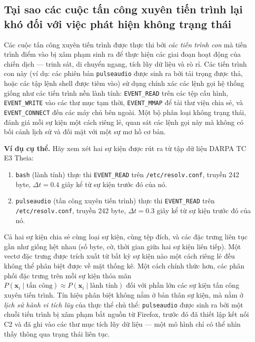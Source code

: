 \documentclass[letterpaper,twocolumn,10pt]{article}
\begin{document}
\subsection{Tại sao các cuộc tấn công xuyên tiến trình lại khó đối với việc phát hiện không trạng thái}
\label{sec:crossprocess_hard}

Các cuộc tấn công xuyên tiến trình được thực thi bởi \emph{các tiến trình con} mà tiến trình điểm vào bị xâm phạm sinh ra để thực hiện các giai đoạn hoạt động của chiến dịch --- trinh sát, di chuyển ngang, tích lũy dữ liệu và rò rỉ. Các tiến trình con này (ví dụ: các phiên bản \texttt{pulseaudio} được sinh ra bởi tải trọng được thả, hoặc các tập lệnh shell được tiêm vào) sử dụng chính xác các lệnh gọi hệ thống giống như các tiến trình nền lành tính: \texttt{EVENT\_READ} trên các tệp cấu hình, \texttt{EVENT\_WRITE} vào các thư mục tạm thời, \texttt{EVENT\_MMAP} để tải thư viện chia sẻ, và \texttt{EVENT\_CONNECT} đến các máy chủ bên ngoài. Một bộ phân loại không trạng thái, đánh giá mỗi sự kiện một cách riêng lẻ, quan sát các lệnh gọi này mà không có bối cảnh lịch sử và đối mặt với một sự mơ hồ cơ bản.

\textbf{Ví dụ cụ thể.} Hãy xem xét hai sự kiện được rút ra từ tập dữ liệu DARPA TC E3 Theia:
\begin{enumerate}
    \item \texttt{bash} (lành tính) thực thi \texttt{EVENT\_READ} trên \texttt{/etc/resolv.conf}, truyền 242 byte, $\Delta t = 0.4$ giây kể từ sự kiện trước đó của nó.
    \item \texttt{pulseaudio} (tấn công xuyên tiến trình) thực thi \texttt{EVENT\_READ} trên \texttt{/etc/resolv.conf}, truyền 242 byte, $\Delta t = 0.3$ giây kể từ sự kiện trước đó của nó.
\end{enumerate}
Cả hai sự kiện chia sẻ cùng loại sự kiện, cùng tệp đích, và các đặc trưng liên tục gần như giống hệt nhau (số byte, cờ, thời gian giữa hai sự kiện liên tiếp). Một vectơ đặc trưng được trích xuất từ bất kỳ sự kiện nào một cách riêng lẻ đều không thể phân biệt được về mặt thống kê. Một cách chính thức hơn, các phân phối đặc trưng trên mỗi sự kiện thỏa mãn $P(\mathbf{x}_i \mid \text{tấn công}) \approx P(\mathbf{x}_i \mid \text{lành tính})$ đối với phần lớn các sự kiện tấn công xuyên tiến trình. Tín hiệu phân biệt không nằm ở bản thân sự kiện, mà nằm ở \emph{lịch sử hành vi tích lũy} của thực thể chủ thể: \texttt{pulseaudio} được sinh ra bởi một chuỗi tiến trình bị xâm phạm bắt nguồn từ Firefox, trước đó đã thiết lập kết nối C2 và đã ghi vào các thư mục tích lũy dữ liệu --- một mô hình chỉ có thể nhìn thấy thông qua trạng thái liên tục.
\end{document}
